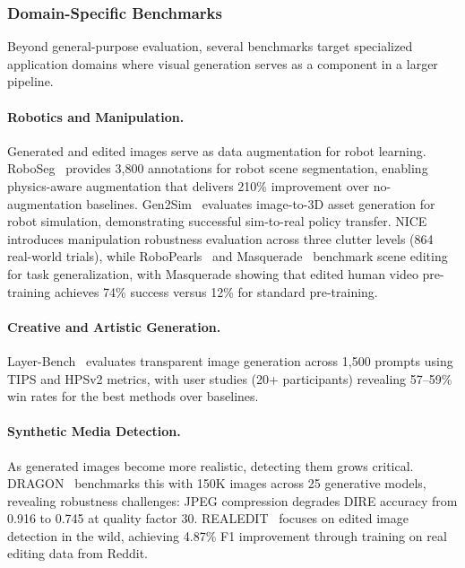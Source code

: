 \subsubsection{Domain-Specific Benchmarks}

Beyond general-purpose evaluation, several benchmarks target specialized application domains where visual generation serves as a component in a larger pipeline.

\paragraph{Robotics and Manipulation.} Generated and edited images serve as data augmentation for robot learning. RoboSeg~\citep{RoboEngine} provides 3,800 annotations for robot scene segmentation, enabling physics-aware augmentation that delivers 210\% improvement over no-augmentation baselines. Gen2Sim~\citep{Gen2Sim} evaluates image-to-3D asset generation for robot simulation, demonstrating successful sim-to-real policy transfer. NICE~\citep{NICE} introduces manipulation robustness evaluation across three clutter levels (864 real-world trials), while RoboPearls~\citep{RoboPearls} and Masquerade~\citep{lepert2025masquerade} benchmark scene editing for task generalization, with Masquerade showing that edited human video pre-training achieves 74\% success versus 12\% for standard pre-training.

\paragraph{Creative and Artistic Generation.} Layer-Bench~\citep{ART_plus_multi-layer} evaluates transparent image generation across 1,500 prompts using TIPS and HPSv2 metrics, with user studies (20+ participants) revealing 57--59\% win rates for the best methods over baselines.

\paragraph{Synthetic Media Detection.} As generated images become more realistic, detecting them grows critical. DRAGON~\citep{DRAGON} benchmarks this with 150K images across 25 generative models, revealing robustness challenges: JPEG compression degrades DIRE accuracy from 0.916 to 0.745 at quality factor 30. REALEDIT~\citep{REALEDIT} focuses on edited image detection in the wild, achieving 4.87\% F1 improvement through training on real editing data from Reddit.

